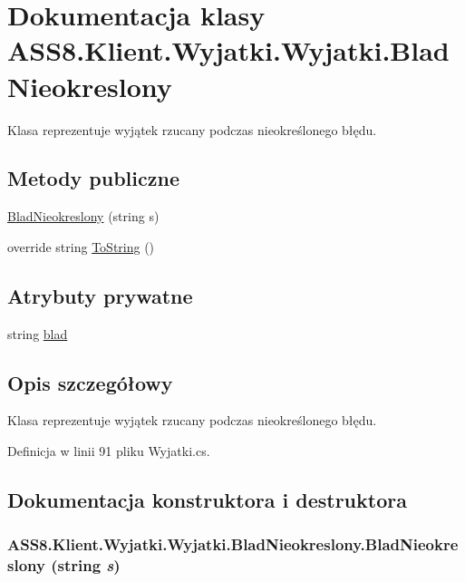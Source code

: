 \hypertarget{a00031}{
\section{Dokumentacja klasy ASS8.Klient.Wyjatki.Wyjatki.BladNieokreslony}
\label{df/d61/a00031}
}
Klasa reprezentuje wyjątek rzucany podczas nieokreślonego błędu.  


\subsection*{Metody publiczne}
\begin{CompactItemize}
\item 
\hyperlink{a00031_1832a7ca413312954fb85bdd713c581d}{BladNieokreslony} (string s)
\item 
override string \hyperlink{a00031_ee38a23a4d2e7d8436ac4675b090ba85}{ToString} ()
\end{CompactItemize}
\subsection*{Atrybuty prywatne}
\begin{CompactItemize}
\item 
string \hyperlink{a00031_bd1fe8688d61cbad9c7349a6336da357}{blad}
\end{CompactItemize}


\subsection{Opis szczegółowy}
Klasa reprezentuje wyjątek rzucany podczas nieokreślonego błędu. 



Definicja w linii 91 pliku Wyjatki.cs.

\subsection{Dokumentacja konstruktora i destruktora}
\hypertarget{a00031_1832a7ca413312954fb85bdd713c581d}{
\subsubsection[{BladNieokreslony}]{\setlength{\rightskip}{0pt plus 5cm}ASS8.Klient.Wyjatki.Wyjatki.BladNieokreslony.BladNieokreslony (string {\em s})}}
\label{df/d61/a00031_1832a7ca413312954fb85bdd713c581d}




